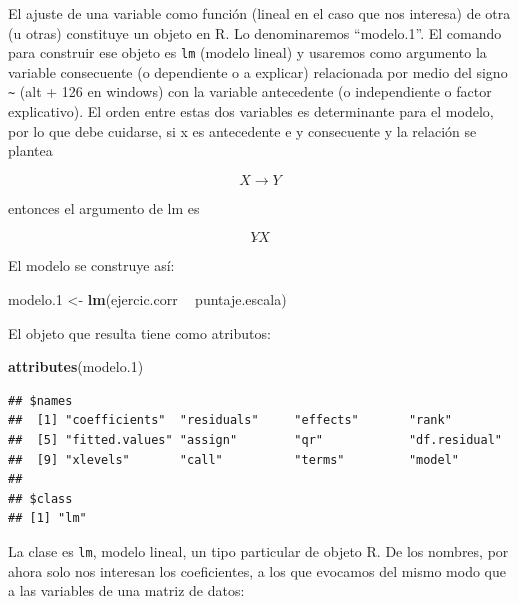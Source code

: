 \documentclass[]{book}
\newenvironment{Shaded}{\begin{snugshade}}{\end{snugshade}}
\newcommand{\FloatTok}[1]{\textcolor[rgb]{0.00,0.00,0.81}{#1}}
\newcommand{\KeywordTok}[1]{\textcolor[rgb]{0.13,0.29,0.53}{\textbf{#1}}}
\newcommand{\NormalTok}[1]{#1}
\newcommand{\OperatorTok}[1]{\textcolor[rgb]{0.81,0.36,0.00}{\textbf{#1}}}
\newcommand{\StringTok}[1]{\textcolor[rgb]{0.31,0.60,0.02}{#1}}
\begin{document}
El ajuste de una variable como función (lineal en el caso que nos interesa) de otra (u otras) constituye un objeto en R. Lo denominaremos ``modelo.1''. El comando para construir ese objeto es \texttt{lm} (modelo lineal) y usaremos como argumento la variable consecuente (o dependiente o a explicar) relacionada por medio del signo \texttt{\textasciitilde{}} (alt + 126 en windows) con la variable antecedente (o independiente o factor explicativo). El orden entre estas dos variables es determinante para el modelo, por lo que debe cuidarse, si x es antecedente e y consecuente y la relación se plantea

\[X \rightarrow Y\]

entonces el argumento de lm es

\[Y \tilde{} X\]

El modelo se construye así:

\begin{Shaded}
\begin{Highlighting}[]
\NormalTok{modelo}\FloatTok{.1}\NormalTok{ <-}\StringTok{ }\KeywordTok{lm}\NormalTok{(ejercic.corr }\OperatorTok{~}\StringTok{ }\NormalTok{puntaje.escala)}
\end{Highlighting}
\end{Shaded}

El objeto que resulta tiene como atributos:

\begin{Shaded}
\begin{Highlighting}[]
\KeywordTok{attributes}\NormalTok{(modelo}\FloatTok{.1}\NormalTok{)}
\end{Highlighting}
\end{Shaded}

\begin{verbatim}
## $names
##  [1] "coefficients"  "residuals"     "effects"       "rank"         
##  [5] "fitted.values" "assign"        "qr"            "df.residual"  
##  [9] "xlevels"       "call"          "terms"         "model"        
## 
## $class
## [1] "lm"
\end{verbatim}

La clase es \texttt{lm}, modelo lineal, un tipo particular de objeto R. De los nombres, por ahora solo nos interesan los coeficientes, a los que evocamos del mismo modo que a las variables de una matriz de datos:

\begin{Shaded}
\end{Shaded}
\end{document}
